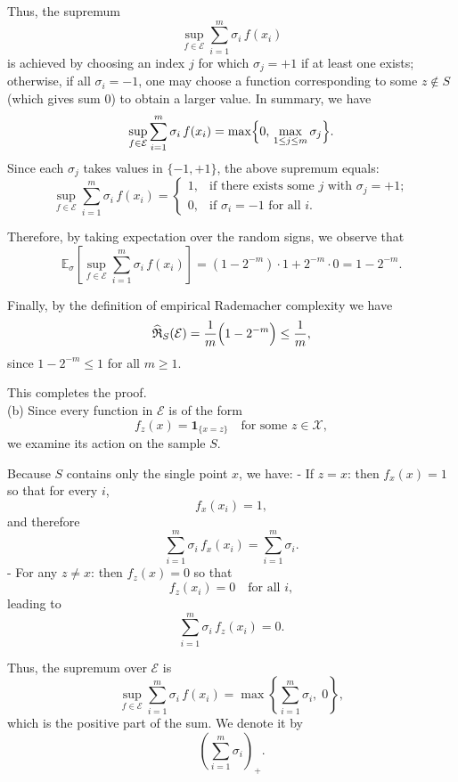 \documentclass[letterpaper, 11pt]{article}
\newcommand{\1}{\mathds{1}}	%
\theoremstyle{definition}
\begin{document}
Thus, the supremum 
\[
\sup_{f\in \mathcal{E}}\sum_{i=1}^m \sigma_i\,f(x_i)
\]
is achieved by choosing an index \(j\) for which \(\sigma_j=+1\) if at least one exists; otherwise, if all \(\sigma_i=-1\), one may choose a function corresponding to some \(z\notin S\) (which gives sum \(0\)) to obtain a larger value. In summary, we have
\[
\sup_{f\in \mathcal{E}}\sum_{i=1}^m \sigma_i\,f(x_i)
=\max\Bigl\{0,\,\max_{1\le j\le m} \sigma_j\Bigr\}.
\]
Since each \(\sigma_j\) takes values in \(\{-1,+1\}\), the above supremum equals:
\[
\sup_{f\in \mathcal{E}}\sum_{i=1}^m \sigma_i\,f(x_i)=
\begin{cases}
1, &\text{if there exists some } j \text{ with } \sigma_j=+1; \\
0, &\text{if } \sigma_i=-1 \text{ for all } i.
\end{cases}
\]

Therefore, by taking expectation over the random signs, we observe that
\[
\mathbb{E}_{\sigma}\!\left[\sup_{f\in \mathcal{E}}\sum_{i=1}^m \sigma_i\,f(x_i)\right]
=(1-2^{-m})\cdot 1 + 2^{-m}\cdot 0 = 1-2^{-m}.
\]

Finally, by the definition of empirical Rademacher complexity we have
\[
\widehat{\mathfrak{R}}_S(\mathcal{E})
=\frac{1}{m}\Bigl(1-2^{-m}\Bigr)
\le \frac{1}{m},
\]
since \(1-2^{-m}\le 1\) for all \(m\ge 1\).

This completes the proof.
\\(b)
Since every function in \(\mathcal{E}\) is of the form
\[
f_{z}(x) = \mathbf{1}_{\{x=z\}} \quad \text{for some } z\in\mathcal{X},
\]
we examine its action on the sample \(S\).

Because \(S\) contains only the single point \(x\), we have:
- If \(z=x\): then \(f_x(x) = 1\) so that for every \(i\),
  \[
  f_x(x_i) = 1,
  \]
  and therefore
  \[
  \sum_{i=1}^{m} \sigma_i\, f_x(x_i) = \sum_{i=1}^{m} \sigma_i.
  \]
- For any \(z \neq x\): then \(f_z(x) = 0\) so that
  \[
  f_z(x_i) = 0 \quad \text{for all } i,
  \]
  leading to
  \[
  \sum_{i=1}^{m} \sigma_i\, f_z(x_i) = 0.
  \]

Thus, the supremum over \(\mathcal{E}\) is
\[
\sup_{f\in\mathcal{E}} \sum_{i=1}^m \sigma_i\, f(x_i)
=\max\left\{\sum_{i=1}^m \sigma_i,\; 0\right\},
\]
which is the positive part of the sum. We denote it by
\[
\left(\sum_{i=1}^m \sigma_i\right)_+.
\]
\end{document}

